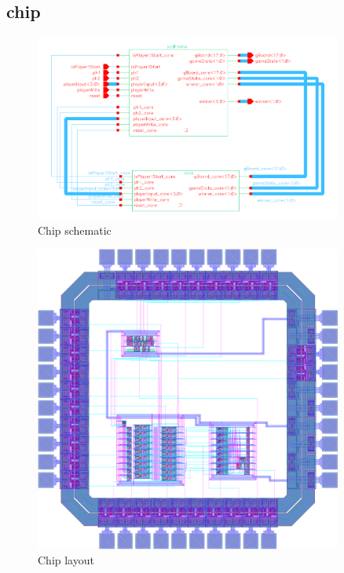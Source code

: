 \documentclass[]{article}
\begin{document}
\subsection{chip}
\begin{figure}[H]
\centering
\includegraphics[width=0.9\textwidth]{chip-schematic}
\caption{Chip schematic}
\label{fig:chip-schematic}
\end{figure}

\begin{figure}[H]
\centering
\includegraphics[width=0.9\textwidth]{chip-layout}
\caption{Chip layout}
\label{fig:chip-layout}
\end{figure}
\end{document}
